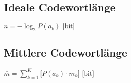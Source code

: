 \begin{multicols}{2}
\subsection*{Ideale Codewortlänge}
$\displaystyle n = -\log_2{P(a_k)} \mbox{  [bit]}$

\subsection*{Mittlere Codewortlänge}
$\displaystyle \overline{m} = 
	\sum_{k=1}^{K} \bigg[ P(a_k) 
	\cdot m_k \bigg] \mbox{  [bit]}$

\end{multicols}